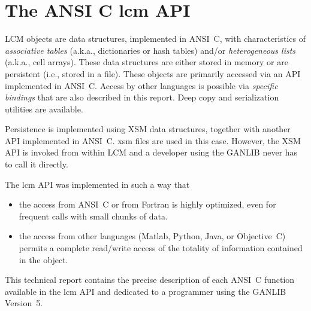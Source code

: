 \section {The ANSI C {\sc lcm} API}\label{sect:lcmapiC}

LCM objects are data structures, implemented in ANSI~C, with characteristics of {\sl associative tables} (a.k.a., dictionaries or
hash tables) and/or {\sl heterogeneous lists} (a.k.a., cell arrays). These data structures are either stored in memory or are persistent
(i.e., stored in a file). These objects are primarily accessed via an API implemented in ANSI~C. Access by other languages is
possible via {\sl specific bindings} that are also described in this report. Deep copy and serialization utilities are available.

\vskip 0.08cm

Persistence is implemented using XSM data structures, together with another API implemented in ANSI~C. {\sc xsm} files are used
in this case. However, the XSM API
is invoked from within LCM and a developer using the GANLIB never has to call it directly.

\vskip 0.08cm

The {\sc lcm} API was implemented in such a way that
\begin{itemize}
\item the access from ANSI~C or from Fortran is highly optimized, even for frequent calls with small chunks of data.
\item the access from other languages (Matlab, Python, Java, or Objective~C) permits a complete read/write access
of the totality of information contained in the object.
\end{itemize}

\vskip 0.08cm

This technical report contains the precise description of each ANSI~C function available in the {\sc lcm} API and dedicated
to a programmer using the GANLIB Version~5.

\vskip 0.08cm

